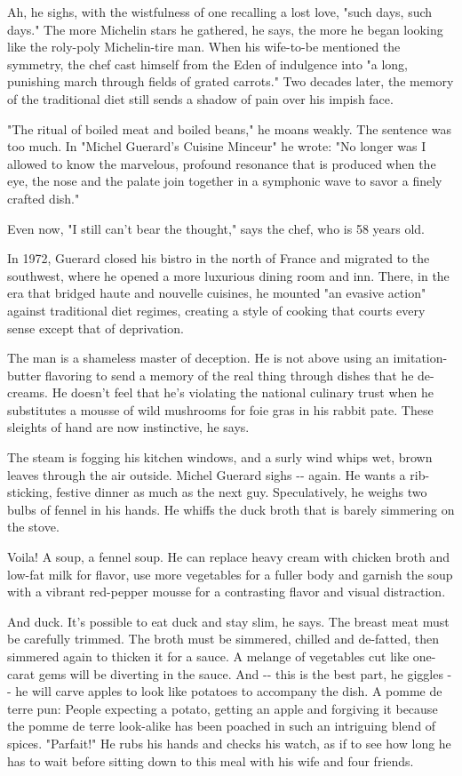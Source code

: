 Ah, he sighs, with the wistfulness of one recalling a lost love, "such
days, such days." The more Michelin stars he gathered, he says, the more
he began looking like the roly-poly Michelin-tire man. When his
wife-to-be mentioned the symmetry, the chef cast himself from the Eden
of indulgence into "a long, punishing march through fields of grated
carrots." Two decades later, the memory of the traditional diet still
sends a shadow of pain over his impish face.

"The ritual of boiled meat and boiled beans," he moans weakly. The
sentence was too much. In "Michel Guerard's Cuisine Minceur" he wrote:
"No longer was I allowed to know the marvelous, profound resonance that
is produced when the eye, the nose and the palate join together in a
symphonic wave to savor a finely crafted dish."

Even now, "I still can't bear the thought," says the chef, who is 58
years old.

In 1972, Guerard closed his bistro in the north of France and migrated
to the southwest, where he opened a more luxurious dining room and inn.
There, in the era that bridged haute and nouvelle cuisines, he mounted
"an evasive action" against traditional diet regimes, creating a style
of cooking that courts every sense except that of deprivation.

The man is a shameless master of deception. He is not above using an
imitation-butter flavoring to send a memory of the real thing through
dishes that he de-creams. He doesn't feel that he's violating the
national culinary trust when he substitutes a mousse of wild mushrooms
for foie gras in his rabbit pate. These sleights of hand are now
instinctive, he says.

The steam is fogging his kitchen windows, and a surly wind whips wet,
brown leaves through the air outside. Michel Guerard sighs -\/- again.
He wants a rib-sticking, festive dinner as much as the next guy.
Speculatively, he weighs two bulbs of fennel in his hands. He whiffs the
duck broth that is barely simmering on the stove.

Voila! A soup, a fennel soup. He can replace heavy cream with chicken
broth and low-fat milk for flavor, use more vegetables for a fuller body
and garnish the soup with a vibrant red-pepper mousse for a contrasting
flavor and visual distraction.

And duck. It's possible to eat duck and stay slim, he says. The breast
meat must be carefully trimmed. The broth must be simmered, chilled and
de-fatted, then simmered again to thicken it for a sauce. A melange of
vegetables cut like one-carat gems will be diverting in the sauce. And
-\/- this is the best part, he giggles -\/- he will carve apples to look
like potatoes to accompany the dish. A pomme de terre pun: People
expecting a potato, getting an apple and forgiving it because the pomme
de terre look-alike has been poached in such an intriguing blend of
spices. "Parfait!" He rubs his hands and checks his watch, as if to see
how long he has to wait before sitting down to this meal with his wife
and four friends.

